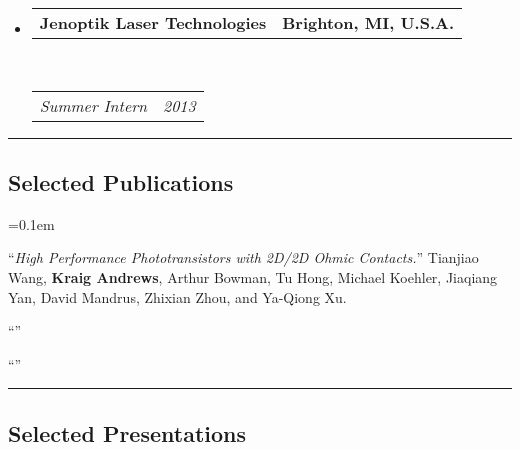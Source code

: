\documentclass[10pt,letterpaper]{article}
\makeatletter
\newcommand{\headerrow}[2]
{\begin{tabular*}{\linewidth}{l@{\extracolsep{\fill}}r}
	#1 &
	#2 \\
\end{tabular*}}
\makeatother
\begin{document}
\begin{itemize}
	\item 
	\headerrow
		{\textbf{Jenoptik Laser Technologies}}
		{\textbf{Brighton, MI, U.S.A.}}
	\\
	\headerrow
		{\emph{Summer Intern}}
		{\emph{2013}}
\end{itemize}

\hrule
\vspace{-0.4em}
\subsection*{Selected Publications}

\begin{enumerate*}
	\parskip=0.1em
	\item ``\emph{High Performance  Phototransistors with 2D/2D Ohmic Contacts.}''
	Tianjiao Wang, \textbf{Kraig Andrews}, Arthur Bowman, Tu Hong, Michael Koehler, Jiaqiang Yan, David Mandrus, Zhixian Zhou, and Ya-Qiong Xu.
	\item ``\emph{}''
	\item ``\emph{}''
\end{enumerate*}

\hrule
\vspace{-0.4em}
\subsection*{Selected Presentations}
\end{document}
